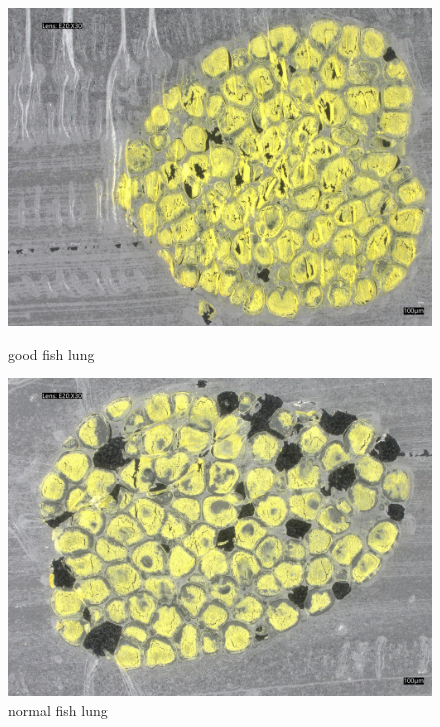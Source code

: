 \begin{figure}
    \centering
    \begin{minipage}{0.45\textwidth}
        \centering
        \includegraphics[width=\textwidth]{./fig/fish_lung/good20240313_144138.jpg}
        \caption{good fish lung}
        \label{fig:good_fish_lung}
    \end{minipage}
    \begin{minipage}{0.45\textwidth}
        \centering
        \includegraphics[width=\textwidth]{./fig/fish_lung/normal20240313_141726.jpg}
        \caption{normal fish lung}
        \label{fig:noraml_fish_lung}
    \end{minipage}
\end{figure}

